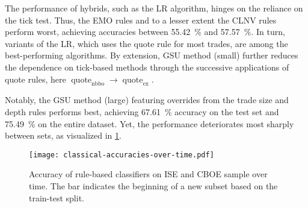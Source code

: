 The performance of hybrids, such as the \gls{LR} algorithm, hinges on the reliance on the tick test. Thus, the \gls{EMO} rules and to a lesser extent the \gls{CLNV} rules perform worst, achieving accuracies between \SI{55.42}{\percent} and \SI{57.57}{\percent}. In turn, variants of the \gls{LR}, which uses the quote rule for most trades, are among the best-performing algorithms. By extension, \gls{GSU} method (small) further reduces the dependence on tick-based methods through the successive applications of quote rules, here $\operatorname{quote}_{\mathrm{nbbo}} \to \operatorname{quote}_{\mathrm{ex}}$.

Notably, the \gls{GSU} method (large) featuring overrides from the trade size and depth rules performs best, achieving \SI{67.61}{\percent} accuracy on the test set and \SI{75.49}{\percent} on the entire dataset. Yet, the performance deteriorates most sharply between sets, as visualized in \cref{fig:classical-accuracies-over-time}.

\begin{figure}[ht]
    \centering
    \texttt{[image: classical-accuracies-over-time.pdf]}
    \caption[Accuracy of Rule-Based Classifiers Over Time]{Accuracy of rule-based classifiers on \gls{ISE} and \gls{CBOE} sample over time. The bar \myline{} indicates the beginning of a new subset based on the train-test split.}
    \label{fig:classical-accuracies-over-time}
\end{figure}

